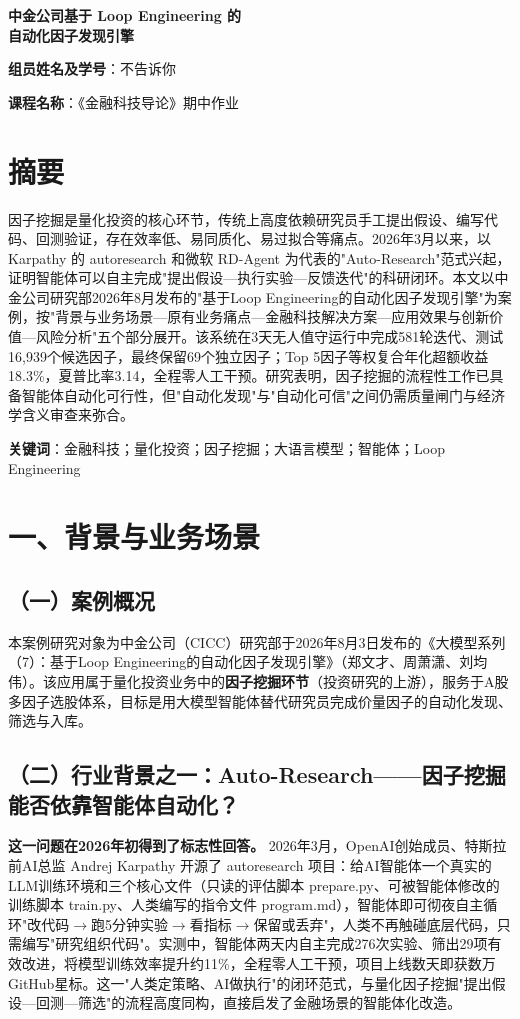 \documentclass[UTF8,a4paper,zihao=-4,fontset=fandol]{ctexart}
\begin{document}
\begin{center}
{\LARGE\bfseries 中金公司基于 Loop Engineering 的\\[6pt]自动化因子发现引擎\par}
\vspace{14pt}
\textbf{组员姓名及学号}：不告诉你\par
\textbf{课程名称}：《金融科技导论》期中作业\par
\end{center}
\section{摘要}
因子挖掘是量化投资的核心环节，传统上高度依赖研究员手工提出假设、编写代码、回测验证，存在效率低、易同质化、易过拟合等痛点。2026年3月以来，以 Karpathy 的 autoresearch 和微软 RD-Agent 为代表的"Auto-Research"范式兴起，证明智能体可以自主完成"提出假设—执行实验—反馈迭代"的科研闭环。本文以中金公司研究部2026年8月发布的"基于Loop Engineering的自动化因子发现引擎"为案例，按"背景与业务场景—原有业务痛点—金融科技解决方案—应用效果与创新价值—风险分析"五个部分展开。该系统在3天无人值守运行中完成581轮迭代、测试16,939个候选因子，最终保留69个独立因子；Top 5因子等权复合年化超额收益18.3\%，夏普比率3.14，全程零人工干预。研究表明，因子挖掘的流程性工作已具备智能体自动化可行性，但"自动化发现"与"自动化可信"之间仍需质量闸门与经济学含义审查来弥合。

\textbf{关键词}：金融科技；量化投资；因子挖掘；大语言模型；智能体；Loop Engineering

\section{一、背景与业务场景}
\subsection{（一）案例概况}
本案例研究对象为中金公司（CICC）研究部于2026年8月3日发布的《大模型系列（7）：基于Loop Engineering的自动化因子发现引擎》（郑文才、周萧潇、刘均伟）\cite{cicc-loop-2026}。该应用属于量化投资业务中的\textbf{因子挖掘环节}（投资研究的上游），服务于A股多因子选股体系，目标是用大模型智能体替代研究员完成价量因子的自动化发现、筛选与入库。

\subsection{（二）行业背景之一：Auto-Research——因子挖掘能否依靠智能体自动化？}
\textbf{这一问题在2026年初得到了标志性回答。} 2026年3月，OpenAI创始成员、特斯拉前AI总监 Andrej Karpathy 开源了 autoresearch 项目：给AI智能体一个真实的LLM训练环境和三个核心文件（只读的评估脚本 prepare.py、可被智能体修改的训练脚本 train.py、人类编写的指令文件 program.md），智能体即可彻夜自主循环"改代码\ensuremath{\rightarrow}跑5分钟实验\ensuremath{\rightarrow}看指标\ensuremath{\rightarrow}保留或丢弃"，人类不再触碰底层代码，只需编写"研究组织代码"\cite{karpathy-autoresearch}\cite{infoq-autoresearch}。实测中，智能体两天内自主完成276次实验、筛出29项有效改进，将模型训练效率提升约11\%，全程零人工干预，项目上线数天即获数万GitHub星标\cite{infoq-autoresearch}。这一"人类定策略、AI做执行"的闭环范式，与量化因子挖掘"提出假设—回测—筛选"的流程高度同构，直接启发了金融场景的智能体化改造。
\end{document}
